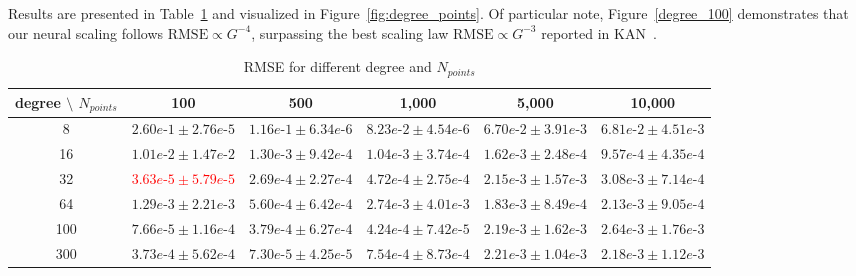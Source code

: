 Results are presented in Table~\ref{table: degree_points} and visualized in Figure~\ref{fig:degree_points}. Of particular note, Figure~\ref{degree_100} demonstrates that our neural scaling follows $\mathrm{RMSE} \propto G^{-4}$, surpassing the best scaling law $\mathrm{RMSE} \propto G^{-3}$ reported in KAN~\citep{liu2024kan}.
\begin{table}[ht]
\caption{RMSE for different degree and $N_{points}$}
\label{table: degree_points}
\begin{center}
\begin{adjustbox}{width=\columnwidth, center}
\begin{tabular}{clllll}
degree $\setminus$ $N_{points}$& \multicolumn{1}{c}{100} &\multicolumn{1}{c}{500} & \multicolumn{1}{c}{1,000} & \multicolumn{1}{c}{5,000} & \multicolumn{1}{c}{10,000}
\\ \hline
8 &$2.60e\mbox{-}1 \pm 2.76e\mbox{-}5$     & $1.16e\mbox{-}1 \pm 6.34e\mbox{-}6$   & $8.23e\mbox{-}2 \pm 4.54e\mbox{-}6$ & $6.70e\mbox{-}2 \pm 3.91e\mbox{-}3$ & $6.81e\mbox{-}2 \pm 4.51e\mbox{-}3$ \\
16                         & $1.01e\mbox{-}2 \pm 1.47e\mbox{-}2$  & $1.30e\mbox{-}3 \pm 9.42e\mbox{-}4$   & $1.04e\mbox{-}3 \pm 3.74e\mbox{-}4$ & $1.62e\mbox{-}3 \pm 2.48e\mbox{-}4$ & $9.57e\mbox{-}4 \pm 4.35e\mbox{-}4$ \\
32                         & \textcolor{red}{$3.63e\mbox{-}5 \pm 5.79e\mbox{-}5$}   & $2.69e\mbox{-}4 \pm 2.27e\mbox{-}4$   & $4.72e\mbox{-}4 \pm 2.75e\mbox{-}4$ & $2.15e\mbox{-}3 \pm 1.57e\mbox{-}3$ & $3.08e\mbox{-}3 \pm 7.14e\mbox{-}4$ \\
  64                       & $1.29e\mbox{-}3 \pm 2.21e\mbox{-}3$  & $5.60e\mbox{-}4 \pm 6.42e\mbox{-}4$   & $2.74e\mbox{-}3 \pm 4.01e\mbox{-}3$ & $1.83e\mbox{-}3 \pm 8.49e\mbox{-}4$ & $2.13e\mbox{-}3 \pm 9.05e\mbox{-}4$ \\
100 &$7.66e\mbox{-}5 \pm 1.16e\mbox{-}4$    & $3.79e\mbox{-}4 \pm 6.27e\mbox{-}4$  & $4.24e\mbox{-}4 \pm 7.42e\mbox{-}5$ & $2.19e\mbox{-}3 \pm 1.62e\mbox{-}3$ & $2.64e\mbox{-}3 \pm 1.76e\mbox{-}3$  \\ 
 300                        & $3.73e\mbox{-}4 \pm 5.62e\mbox{-}4$  &  $7.30e\mbox{-}5 \pm 4.25e\mbox{-}5$ & $7.54e\mbox{-}4 \pm 8.73e\mbox{-}4$ & $2.21e\mbox{-}3 \pm 1.04e\mbox{-}3$ & $2.18e\mbox{-}3 \pm 1.12e\mbox{-}3$  \\ 
\end{tabular}
\end{adjustbox}
\end{center}
\end{table}

